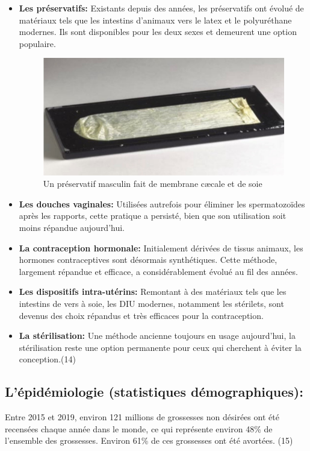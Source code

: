 \begin{itemize}[label={$\bullet$}, align=right]
  \item \textbf{Les préservatifs: }Existants depuis des années, les préservatifs ont évolué de matériaux tels que les intestins d'animaux vers le latex et le polyuréthane modernes. Ils sont disponibles pour les deux sexes et demeurent une option populaire.


\begin{figure}[H]
    \centering
    \includegraphics[scale=0.8]{Images/fig_10.jpg}
    \caption{Un préservatif masculin fait de membrane cæcale et de soie}
\end{figure}

\item \textbf{Les douches vaginales: }Utilisées autrefois pour éliminer les spermatozoïdes après les rapports, cette pratique a persisté, bien que son utilisation soit moins répandue aujourd'hui.

  \item \textbf{La contraception hormonale: }Initialement dérivées de tissus animaux, les hormones contraceptives sont désormais synthétiques. Cette méthode, largement répandue et efficace, a considérablement évolué au fil des années.

  \item \textbf{Les dispositifs intra-utérins: }Remontant à des matériaux tels que les intestins de vers à soie, les DIU modernes, notamment les stérilets, sont devenus des choix répandus et très efficaces pour la contraception.

  \item \textbf{La stérilisation: }Une méthode ancienne toujours en usage aujourd'hui, la stérilisation reste une option permanente pour ceux qui cherchent à éviter la conception.(14) 

\end{itemize}

\subsection{L’épidémiologie (statistiques démographiques): }
\noindent Entre 2015 et 2019, environ 121 millions de grossesses non désirées ont été recensées chaque année dans le monde, ce qui représente environ 48\% de l’ensemble des grossesses. Environ 61\% de ces grossesses ont été avortées. (15)\vspace*{1em}

